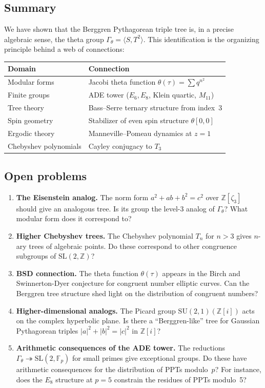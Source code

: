 \documentclass[12pt]{amsart}
\theoremstyle{definition}
\theoremstyle{remark}
\newcommand{\SL}{\mathrm{SL}}
\newcommand{\SU}{\mathrm{SU}}
\newcommand{\Fp}{\mathbb{F}_p}
\newcommand{\Z}{\mathbb{Z}}
\newcommand{\Gtheta}{\Gamma_\theta}
\begin{document}
\subsection{Summary}
We have shown that the Berggren Pythagorean triple tree is, in a precise
algebraic sense, the theta group $\Gtheta = \langle S, T^2\rangle$.
This identification is the organizing principle behind a web of
connections:

\begin{center}
\begin{tabular}{ll}
\toprule
Domain & Connection \\
\midrule
Modular forms & Jacobi theta function $\theta(\tau) = \sum q^{n^2}$ \\
Finite groups & ADE tower ($E_6, E_8$, Klein quartic, $M_{11}$) \\
Tree theory & Bass--Serre ternary structure from index~3 \\
Spin geometry & Stabilizer of even spin structure $\theta[0,0]$ \\
Ergodic theory & Manneville--Pomeau dynamics at $z=1$ \\
Chebyshev polynomials & Cayley conjugacy to $T_3$ \\
\bottomrule
\end{tabular}
\end{center}

\subsection{Open problems}

\begin{enumerate}
\item \textbf{The Eisenstein analog.}
The norm form $a^2+ab+b^2 = c^2$ over $\Z[\zeta_3]$ should give an
analogous tree.  Is its group the level-3 analog of $\Gtheta$?  What
modular form does it correspond to?

\item \textbf{Higher Chebyshev trees.}
The Chebyshev polynomial $T_n$ for $n > 3$ gives $n$-ary trees of
algebraic points.  Do these correspond to other congruence subgroups of
$\SL(2,\Z)$?

\item \textbf{BSD connection.}
The theta function $\theta(\tau)$ appears in the Birch and
Swinnerton-Dyer conjecture for congruent number elliptic curves.  Can
the Berggren tree structure shed light on the distribution of congruent
numbers?

\item \textbf{Higher-dimensional analogs.}
The Picard group $\SU(2,1)(\Z[i])$ acts on the complex hyperbolic plane.
Is there a ``Berggren-like'' tree for Gaussian Pythagorean triples
$|a|^2 + |b|^2 = |c|^2$ in $\Z[i]$?

\item \textbf{Arithmetic consequences of the ADE tower.}
The reductions $\Gtheta \twoheadrightarrow \SL(2,\Fp)$ for small primes
give exceptional groups.  Do these have arithmetic consequences for the
distribution of PPTs modulo~$p$?  For instance, does the $E_8$ structure
at $p=5$ constrain the residues of PPTs modulo~5?
\end{enumerate}
\end{document}

